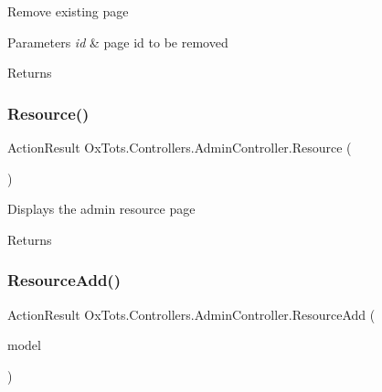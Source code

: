 Remove existing page 


\begin{DoxyParams}{Parameters}
{\em id} & page id to be removed\\
\hline
\end{DoxyParams}
\begin{DoxyReturn}{Returns}

\end{DoxyReturn}
\mbox{\label{class_ox_tots_1_1_controllers_1_1_admin_controller_ac9882a823484bb9c8b4aa5d69d9acb3c}} 
\subsubsection{\texorpdfstring{Resource()}{Resource()}}
{\footnotesize\ttfamily Action\+Result Ox\+Tots.\+Controllers.\+Admin\+Controller.\+Resource (\begin{DoxyParamCaption}{ }\end{DoxyParamCaption})\hspace{0.3cm}{\ttfamily [inline]}}



Displays the admin resource page 

\begin{DoxyReturn}{Returns}

\end{DoxyReturn}
\mbox{\label{class_ox_tots_1_1_controllers_1_1_admin_controller_a8077cc90ebef79e6d89a7ea0c4d4685a}} 
\subsubsection{\texorpdfstring{ResourceAdd()}{ResourceAdd()}}
{\footnotesize\ttfamily Action\+Result Ox\+Tots.\+Controllers.\+Admin\+Controller.\+Resource\+Add (\begin{DoxyParamCaption}\item[{Admin\+Resource\+View\+Model}]{model }\end{DoxyParamCaption})\hspace{0.3cm}{\ttfamily [inline]}}



